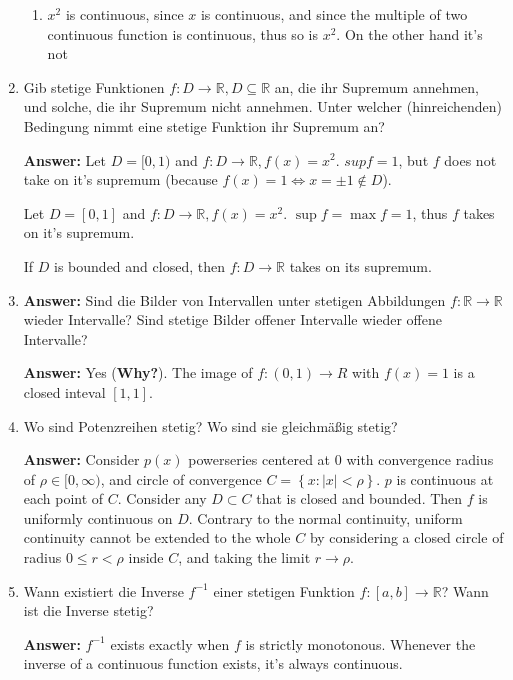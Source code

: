 \documentclass[11pt]{article}
\begin{document}
\begin{enumerate}
\begin{enumerate}
    \item $x^2$ is continuous, since $x$ is continuous, and since the multiple of two continuous function is continuous, thus so is $x^2$. On the other hand it's not 
\end{enumerate}

\item Gib stetige Funktionen $f\colon D \to \mathbb{R}, D \subseteq \mathbb{R}$ an, die ihr Supremum annehmen, und solche, die ihr Supremum nicht annehmen. Unter welcher (hinreichenden) Bedingung nimmt eine stetige Funktion ihr Supremum an?

\textbf{Answer:} Let $D = [0, 1)$ and $f\colon D \to \mathbb{R}, f(x) = x^2$. $sup f = 1$, but $f$ does not take on it's supremum (because $f(x) = 1 \Leftrightarrow x = \pm1 \notin D$).

Let $D = [0, 1]$ and $f\colon D \to \mathbb{R}, f(x) = x^2$. $\sup{f} = \max{f} = 1$, thus $f$ takes on it's supremum.

If $D$ is bounded and closed, then $f\colon D \to \mathbb{R}$ takes on its supremum.

\item \textbf{Answer:} Sind die Bilder von Intervallen unter stetigen Abbildungen $f\colon \mathbb{R} \to \mathbb{R}$ wieder Intervalle? Sind stetige Bilder offener Intervalle wieder offene Intervalle?

\textbf{Answer:} Yes (\textbf{Why?}). The image of $f\colon (0, 1) \to \mathbb{}R$ with $f(x) = 1$ is a closed inteval $[1, 1]$.

\item Wo sind Potenzreihen stetig? Wo sind sie gleichmäßig stetig?

\textbf{Answer:} Consider $p(x)$ powerseries centered at $0$ with convergence radius of $\rho \in [0, \infty)$, and circle of convergence $C = \left\{x\colon |x| < \rho\right\}$. $p$ is continuous at each point of $C$. Consider any $D \subset C$ that is closed and bounded. Then $f$ is uniformly continuous on $D$. Contrary to the normal continuity, uniform continuity cannot be extended to the whole $C$ by considering a closed circle of radius $0 \le r < \rho$ inside $C$, and taking the limit $r \to \rho$.

\item Wann existiert die Inverse $f^{-1}$ einer stetigen Funktion $f\colon [a, b] \to \mathbb{R}$? Wann ist die Inverse stetig?

\textbf{Answer:} $f^{-1}$ exists exactly when $f$ is strictly monotonous. Whenever the inverse of a continuous function exists, it's always continuous.


\end{enumerate}
\end{document}

